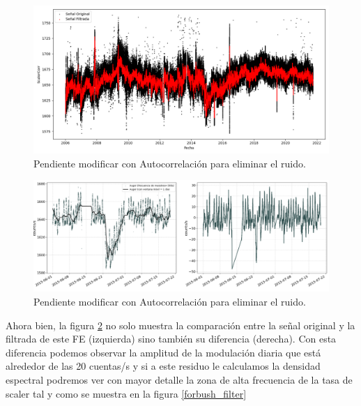 \begin{figure}
\centering
\includegraphics[width=1\linewidth]{Figs/Figr/auger_filter_1D.png}
    \caption{Pendiente modificar con Autocorrelación para eliminar el ruido.}
    \label{1d_filter}
\end{figure}
\begin{figure}
\centering
\includegraphics[width=1.1\linewidth]{Figs/Figr/forbush_filter_1D_DIFERENCIA.pdf}
    \caption{Pendiente modificar con Autocorrelación para eliminar el ruido.}
    \label{filter_result}
\end{figure}
Ahora bien, la figura \ref{filter_result} no solo muestra la comparación entre la señal original y la filtrada de este FE (izquierda)  sino también su diferencia (derecha). Con esta diferencia podemos observar la amplitud de la modulación diaria que está alrededor de las 20 cuentas/s y si a este residuo le calculamos la densidad espectral podremos ver con mayor detalle la zona de alta frecuencia de la tasa de scaler tal y como se muestra en la figura \ref{forbush_filter}

